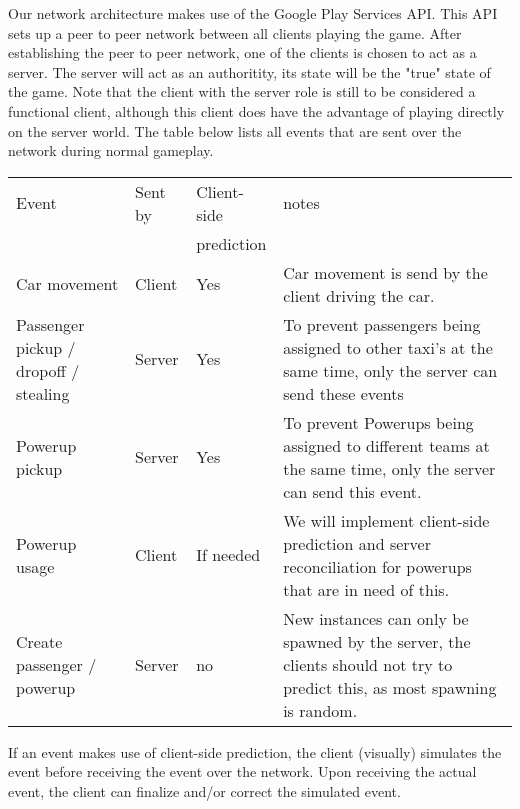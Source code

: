 Our network architecture makes use of the Google Play Services API. This API sets up a peer to peer network between all clients playing the game. After establishing the peer to peer network, one of the clients is chosen to act as a server. The server will act as an authoritity, its state will be the "true" state of the game. Note that the client with the server role is still to be considered a functional client, although this client does have the advantage of playing directly on the server world. The table below lists all events that are sent over the network during normal gameplay.
\begin{center}
    \begin{tabular}{ | p{3cm} | l | l | p{7cm} |}
    \hline
    Event & Sent by &  Client-side & notes\\
	  &	        & prediction  & \\ \hline
    Car movement & Client &Yes  & Car movement is send by the client driving the car. \\ \hline
    Passenger pickup / dropoff / stealing  & Server & Yes & To prevent passengers being assigned to other taxi's at the same time, only the server can send these events \\ \hline
   Powerup pickup & Server & Yes & To prevent Powerups being assigned to different teams at the same time, only the server can send this event. \\ \hline
 Powerup usage & Client & If needed  & We will implement client-side prediction and server reconciliation for powerups that are in need of this. \\ \hline
Create passenger / powerup & Server & no & New instances can only be spawned by the server, the clients should not try to predict this, as most spawning is random. \\ \hline
    \end{tabular}
\end{center}


If an event makes use of client-side prediction, the client (visually) simulates the event before receiving the event over the network. Upon receiving the actual event, the client can finalize and/or correct the simulated event.